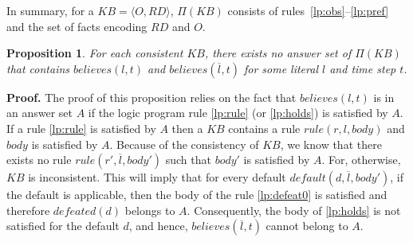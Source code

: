 \documentclass{article}
\newtheorem{proposition}[theorem]{Proposition}
\def\naf{\: {not} \:}
\begin{document}
%
% 
% 
%
%
%
%
%
%
%
%
%

In summary, for a $KB = \langle O, RD \rangle$, $\Pi(KB)$ consists of rules~\eqref{lp:obs}--\eqref{lp:pref} and the set of facts encoding $RD$ and $O$.

%
\begin{proposition}
For each consistent $KB$,  there exists no answer set of $\Pi(KB)$ that contains $believes(l, t)$ and $believes(\overline{l},t)$ for some 
literal $l$ and time step $t$. 
\end{proposition} 
%
\noindent
{\bf Proof.}
The proof of this proposition relies on the fact that $believes(l, t)$ is in an answer set $A$ if the logic program  rule \eqref{lp:rule} (or \eqref{lp:holds}) is satisfied by $A$. If a rule \eqref{lp:rule} is satisfied by $A$ then a $KB$ contains a rule $rule(r,l,body)$ and $body$ is satisfied by $A$. Because of the consistency of $KB$, we know that there exists no rule $rule(r', \overline{l}, body')$ such that $body'$ is satisfied by $A$. For, otherwise, $KB$ is inconsistent. This will imply that for every default $default(d, \overline{l}, body')$, if the default is applicable, then the body of the rule \eqref{lp:defeat0} is satisfied and therefore $defeated(d)$ belongs to $A$. Consequently, the body of \eqref{lp:holds} is not satisfied for the default $d$, and hence, $believes(\overline{l}, t)$ cannot belong to $A$.
\end{document}

